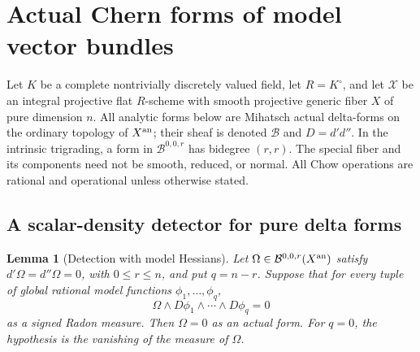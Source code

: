 \documentclass[11pt]{article}
\newtheorem{lemma}[theorem]{Lemma}
\theoremstyle{definition}
\theoremstyle{remark}
\numberwithin{equation}{section}
\begin{document}
\section{Actual Chern forms of model vector bundles}
\label{r10c:section}

Let $K$ be a complete nontrivially discretely valued field, let
$R=K^\circ$, and let $\mathcal X$ be an integral projective flat
$R$-scheme with smooth projective generic fiber $X$ of pure dimension $n$.
All analytic forms below are Mihatsch actual delta-forms on the ordinary
topology of $X^{\rm an}$; their sheaf is denoted $\mathcal B$ and
$D=d'd''$.  In the intrinsic trigrading, a form in
$\mathcal B^{0,0,r}$ has bidegree $(r,r)$.
The special fiber and its components need not be smooth, reduced, or
normal.  All Chow operations are rational and operational unless
otherwise stated.

\subsection{A scalar-density detector for pure delta forms}

\begin{lemma}[Detection with model Hessians]
\label{r10c:detector}
Let $\Omega\in\mathcal B^{0,0,r}(X^{\rm an})$ satisfy
$d'\Omega=d''\Omega=0$, with $0\leq r\leq n$, and put $q=n-r$.  Suppose that for every
tuple of global rational model functions $\phi_1,\ldots,\phi_q$,
\[
                 \Omega\wedge D\phi_1\wedge\cdots\wedge D\phi_q=0
\]
as a signed Radon measure.  Then $\Omega=0$ as an actual form.
For $q=0$, the hypothesis is the vanishing of the measure of $\Omega$.
\end{lemma}
\end{document}
